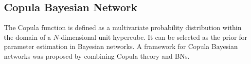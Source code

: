\documentclass{article}
\begin{document}

\subsection{Copula Bayesian Network}
\label{subsec:cbn}
The Copula function is defined as a multivariate probability distribution within the domain of a $N$-dimensional unit hypercube. It can be selected as the prior for parameter estimation in Bayesian networks. A framework for Copula Bayesian networks \cite{ElidanCopula} was proposed by combining Copula theory and BNs.
\end{document}
